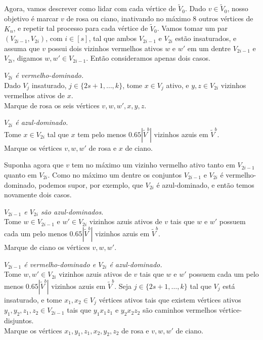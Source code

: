 Agora, vamos descrever como lidar com cada vértice de $\tilde{V}_0$. Dado $v\in \tilde{V}_0$, nosso objetivo é marcar $v$ de rosa ou ciano, inativando no máximo 8 outros vértices de $K_n$, e repetir tal processo para cada vértice de $\tilde{V}_0$.
Vamos tomar um par $(V_{2i-1},V_{2i})$, com $i\in[s]$, tal que ambos $V_{2i-1}$ e $V_{2i}$ estão insaturados, e assuma que $v$ possui dois vizinhos vermelhos ativos $w$ e $w'$ em um dentre $V_{2i-1}$ e $V_{2i}$, digamos $w,w'\in V_{2i-1}$. Então consideramos apenas dois casos.

\setcounter{caso}{0}

\begin{caso}
	\emph{$V_{2i}$ é vermelho-dominado.}\\
	Dado $V_j$ insaturado, $j\in\{2s+1,\dots,k\}$, tome $x\in V_j$ ativo, e $y,z\in V_{2i}$ vizinhos vermelhos ativos de $x$.\\
	Marque de rosa os seis vértices $v,w,w',x,y,z$.
\end{caso}

\begin{caso}
	\emph{$V_{2i}$ é azul-dominado.}\\
	Tome $x\in V_{2i}$ tal que $x$ tem pelo menos $0.65|\tilde{V}^b|$ vizinhos azuis em $\tilde{V}^b$.\\
	Marque os vértices $v,w,w'$ de rosa e $x$ de ciano.
\end{caso}

Suponha agora que $v$ tem no máximo um vizinho vermelho ativo tanto em $V_{2i-1}$ quanto em $V_{2i}$. Como no máximo um dentre os conjuntos $V_{2i-1}$ e $V_{2i}$ é vermelho-dominado, podemos supor, por exemplo, que $V_{2i}$ é azul-dominado, e então temos novamente dois casos.

\setcounter{caso}{0}
\begin{caso}
	\emph{$V_{2i-1}$ e $V_{2i}$ são azul-dominados.}\\
	Tome $w\in V_{2i-1}$ e $w'\in V_{2i}$ vizinhos azuis ativos de $v$ tais que $w$ e $w'$ possuem cada um pelo menos $0.65|\tilde{V}^b|$ vizinhos azuis em $\tilde{V}^b$.\\ 
	Marque de ciano os vértices $v,w,w'$.
\end{caso}

\begin{caso}
	\emph{$V_{2i-1}$ é vermelho-dominado e $V_{2i}$ é azul-dominado.}\\
	Tome $w,w'\in V_{2i}$ vizinhos azuis ativos de $v$ tais que $w$ e $w'$ possuem cada um pelo menos $0.65|\tilde{V}^b|$ vizinhos azuis em $\tilde{V}^b$. Seja $j\in\{2s+1,\dots,k\}$ tal que $V_j$ está insaturado, e tome $x_1,x_2\in V_j$ vértices ativos tais que existem vértices ativos $y_1,y_2,z_1,z_2\in V_{2i-1}$ tais que $y_1x_1z_1$ e $y_2x_2z_2$ são caminhos vermelhos vértice-disjuntos.\\
	Marque os vértices $x_1,y_1,z_1,x_2,y_2,z_2$ de rosa e $v,w,w'$ de ciano.
\end{caso}

